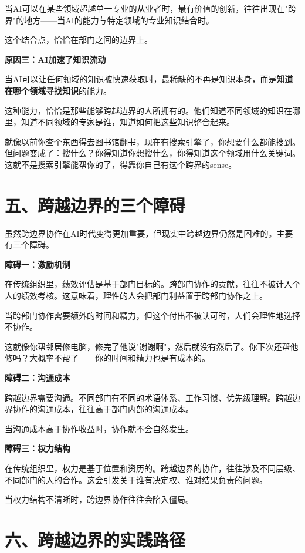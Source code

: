 当AI可以在某些领域超越单一专业的从业者时，最有价值的创新，往往出现在"跨界"的地方——当AI的能力与特定领域的专业知识结合时。

这个结合点，恰恰在部门之间的边界上。

\textbf{原因三：AI加速了知识流动}

当AI可以让任何领域的知识被快速获取时，最稀缺的不再是知识本身，而是\textbf{知道在哪个领域寻找知识}的能力。

这种能力，恰恰是那些能够跨越边界的人所拥有的。他们知道不同领域的知识在哪里，知道不同领域的专家是谁，知道如何把这些知识整合起来。

就像以前你查个东西得去图书馆翻书，现在有搜索引擎了，你想要什么都能搜到。但问题变成了：搜什么？你得知道你想搜什么，你得知道这个领域用什么关键词。这就不是搜索引擎能帮你的了，得靠你自己有这个跨界的sense。

\section{五、跨越边界的三个障碍}


虽然跨边界协作在AI时代变得更加重要，但现实中跨越边界仍然是困难的。主要有三个障碍。

\textbf{障碍一：激励机制}

在传统组织里，绩效评估是基于部门目标的。跨部门协作的贡献，往往不被计入个人的绩效考核。这意味着，理性的人会把部门利益置于跨部门协作之上。

当跨部门协作需要额外的时间和精力，但这个付出不被认可时，人们会理性地选择不协作。

这就像你帮邻居修电脑，修完了他说"谢谢啊"，然后就没有然后了。你下次还帮他修吗？大概率不帮了——你的时间和精力也是有成本的。

\textbf{障碍二：沟通成本}

跨越边界需要沟通。不同部门有不同的术语体系、工作习惯、优先级理解。跨越边界协作的沟通成本，往往高于部门内部的沟通成本。

当沟通成本高于协作收益时，协作就不会自然发生。

\textbf{障碍三：权力结构}

在传统组织里，权力是基于位置和资历的。跨越边界的协作，往往涉及不同层级、不同部门的人的合作。这会引发关于谁有决定权、谁对结果负责的问题。

当权力结构不清晰时，跨边界协作往往会陷入僵局。

\section{六、跨越边界的实践路径}


